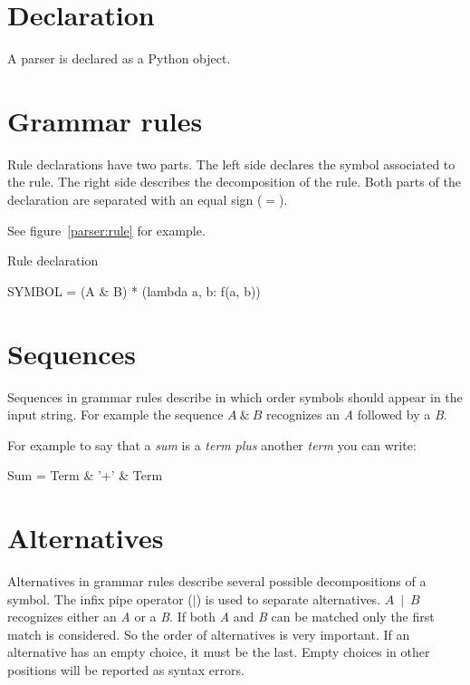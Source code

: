 \section{Declaration}

A parser is declared as a Python object.

\section{Grammar rules}                                         \label{parser:grammar_rules}

Rule declarations have two parts.
The left side declares the symbol associated to the rule.
The right side describes the decomposition of the rule.
Both parts of the declaration are separated with an equal sign (\emph{$=$}).

See figure~\ref{parser:rule} for example.

\begin{code}
\caption{Rule declaration}                                      \label{parser:rule}
\begin{verbatimtab}[4]
    SYMBOL = (A & B) * (lambda a, b: f(a, b))
\end{verbatimtab}
\end{code}

\section{Sequences}                                             \label{parser:sequences}

Sequences in grammar rules describe in which order symbols should appear in the input string.
For example the sequence \emph{$A~\&~B$} recognizes an \emph{A} followed by a \emph{B}.

For example to say that a \emph{sum} is a \emph{term} \emph{plus} another \emph{term} you can write:
\begin{verbatimtab}[4]
    Sum = Term & '+' & Term
\end{verbatimtab}

\section{Alternatives}                                          \label{parser:alternatives}

Alternatives in grammar rules describe several possible decompositions of a symbol.
The infix pipe operator (\emph{$\mid$}) is used to separate alternatives.
\emph{$A~\mid~B$} recognizes either an \emph{A} or a \emph{B}.
If both \emph{A} and \emph{B} can be matched only the first match is considered.
So the order of alternatives is very important.
If an alternative has an empty choice, it must be the last.
Empty choices in other positions will be reported as syntax errors.

